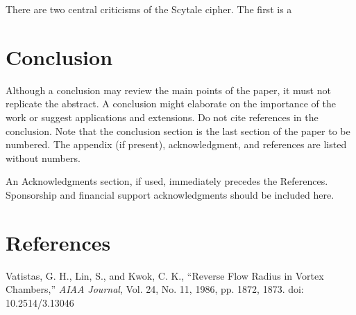 \documentclass{AIAA}
\begin{document}
There are two central criticisms of the Scytale cipher. The first is a 






\section{Conclusion}
Although a conclusion may review the main points of the paper, it must not replicate the abstract. A conclusion might elaborate on the importance of the work or suggest applications and extensions. Do not cite references in the conclusion. Note that the conclusion section is the last section of the paper to be numbered. The appendix (if present), acknowledgment, and references are listed without numbers.

An Acknowledgments section, if used, immediately precedes the References. Sponsorship and financial support acknowledgments should be included here.

\section*{References}

\begin{thebibliography}{}
 Vatistas, G. H., Lin, S., and Kwok, C. K., ``Reverse Flow Radius in Vortex Chambers,'' \textit{AIAA Journal}, Vol. 24, No. 11, 1986, pp. 1872, 1873. doi: 10.2514/3.13046

\end{thebibliography}
\end{document}
